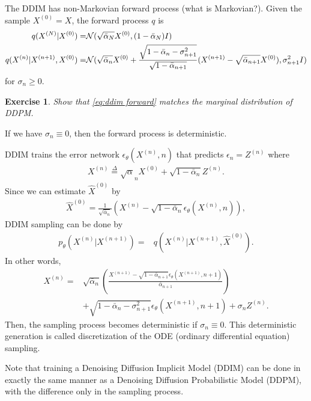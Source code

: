 \documentclass[11pt, a4paper]{article}
\newtheorem{exercise}{Exercise}
\begin{document}
The DDIM has non-Markovian forward process (what is Markovian?).
Given the sample $X^{(0)}=X$, the forward process $q$ is
\begin{align}
    q(X^{(N)}|X^{(0)}) =&  {\cal N}(\sqrt{\bar{\alpha}_N} X^{(0)}, (1-\bar{\alpha}_N)I)\\
    q(X^{(n)}|X^{(n+1)}, X^{(0)}) =& {\cal N}(\sqrt{\bar{\alpha}_n} X^{(0)} + \frac{\sqrt{1-\bar{\alpha}_n 
    - \sigma_{n+1}^2}}{\sqrt{1-\bar{\alpha}_{n+1}}} (X^{(n+1)}-\sqrt{\bar{\alpha}_{n+1}} X^{(0)}), \sigma_{n+1}^2 I)\label{eq:ddim forward}
\end{align}
for $\sigma_n\geq 0$.
\begin{exercise}
    Show that \eqref{eq:ddim forward} matches the marginal distribution of DDPM.
\end{exercise}
If we have $\sigma_n \equiv 0$, then the forward process is deterministic.

DDIM trains the error network $\epsilon_{\theta}(X^{(n)}, n)$ that predicts $\epsilon_n=Z^{(n)}$ where
\begin{align}
    X^{(n)} \stackrel{\Delta}{=} \sqrt{\alpha}_n X^{(0)} + \sqrt{1-\bar{\alpha}_n} Z^{(n)}.
\end{align}
Since we can estimate $\hat{X}^{(0)}$ by
\begin{align}
    \hat{X}^{(0)} = \frac{1}{\sqrt{\bar{\alpha}_n}} (X^{(n)} - \sqrt{1-\bar{\alpha}_n} \epsilon_{\theta}(X^{(n)}, n)),
\end{align}
DDIM sampling can be done by
\begin{align}
    p_{\theta}(X^{(n)}|X^{(n+1)}) =& q(X^{(n)}|X^{(n+1)}, \hat{X}^{(0)}).
\end{align}
In other words,
\begin{align}
    X^{(n)} =& \sqrt{\bar{\alpha}_{n}} \left(\frac{X^{(n+1)} - \sqrt{1-\bar{\alpha}_{n+1}} \epsilon_{\theta} (X^{(n+1)}, n+1)}{\bar{\alpha}_{n+1}}\right) \nonumber\\
    &+ \sqrt{1-\bar{\alpha}_n - \sigma^2_{n+1}} \epsilon_{\theta}(X^{(n+1)}, n+1) + \sigma_n Z^{(n)}.
\end{align}
Then, the sampling process becomes deterministic if $\sigma_n\equiv 0$.
This deterministic generation is called discretization of the ODE (ordinary differential equation) sampling.

Note that training a Denoising Diffusion Implicit Model (DDIM) can be done in exactly the same manner 
as a Denoising Diffusion Probabilistic Model (DDPM), with the difference only in the sampling process.
\end{document}
